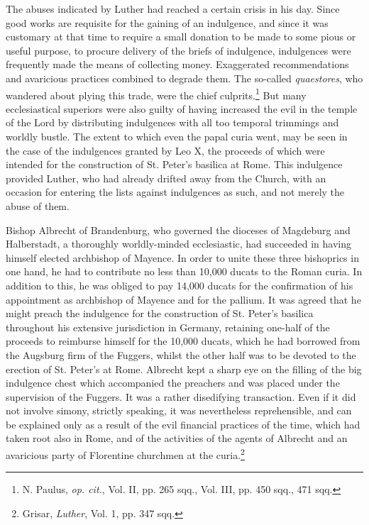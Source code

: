The abuses indicated by Luther had reached a certain crisis in his
day. Since good works are requisite for the gaining of an indulgence,
and since it was customary at that time to require a small donation
to be made to some pious or useful purpose, to procure delivery of
the briefs of indulgence, indulgences were frequently made the
means of collecting money. Exaggerated recommendations and avaricious practices
combined to degrade them. The so-called \textit{quaestores},
who wandered about plying this trade, were the chief culprits.\footnote
{N. Paulus, \textit{op. cit.}, Vol. II, pp. 265 sqq., Vol. III, pp. 450 sqq., 471 sqq.}
But many ecclesiastical superiors were also guilty of having increased
the evil in the temple of the Lord by distributing indulgences with
all too temporal trimmings and worldly bustle.
The extent to which even the papal curia went, may be seen
in the case of the indulgences granted by Leo X, the proceeds of
which were intended for the construction of St. Peter’s basilica
at Rome. This indulgence provided Luther, who had already drifted
away from the Church, with an occasion for entering the lists against
indulgences as such, and not merely the abuse of them.

Bishop Albrecht of Brandenburg, who governed the dioceses of
Magdeburg and Halberstadt, a thoroughly worldly-minded ecclesiastic, had
succeeded in having himself elected archbishop of Mayence.
In order to unite these three bishoprics in one hand, he had to contribute
no less than 10,000 ducats to the Roman curia. In addition
to this, he was obliged to pay 14,000 ducats for the confirmation
of his appointment as archbishop of Mayence and for the pallium.
It was agreed that he might preach the indulgence for the construction
of St. Peter’s basilica throughout his extensive jurisdiction
in Germany, retaining one-half of the proceeds to reimburse
himself for the 10,000 ducats, which he had borrowed from the
Augsburg firm of the Fuggers, whilst the other half was to be devoted
to the erection of St. Peter’s at Rome. Albrecht kept a sharp
eye on the filling of the big indulgence chest which accompanied
the preachers and was placed under the supervision of the Fuggers.
It was a rather disedifying transaction. Even if it did not involve
simony, strictly speaking, it was nevertheless reprehensible, and can
be explained only as a result of the evil financial practices of the
time, which had taken root also in Rome, and of the activities of the
agents of Albrecht and an avaricious party of Florentine churchmen
at the curia.\footnote{Grisar, \textit{Luther}, Vol. 1, pp. 347 sqq.}

